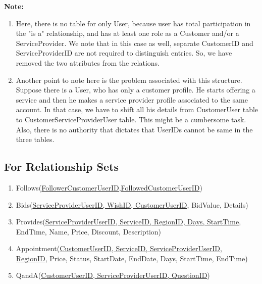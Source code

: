 \documentclass[a4paper]{article}
\begin{document}
\textbf{Note:} 
\begin{enumerate}

\item Here, there is no table for only User, because user has total participation in the "is a" relationship, and has at least one role as a Customer and/or a ServiceProvider. We note that in this case as well, separate CustomerID and ServiceProviderID are not required to distinguish entries. So, we have removed the two attributes from the relations.
\item Another point to note here is the problem associated with this structure. Suppose there is a User, who has only a customer profile. He starts offering a service and then he makes a service provider profile associated to the same account. In that case, we have to shift all his details from CustomerUser table to CustomerServiceProviderUser table. This might be a cumbersome task. Also, there is no authority that dictates that UserIDs cannot be same in the three tables.

\end{enumerate}


\subsection{For Relationship Sets}

\begin{enumerate}
\item Follows(\underline{FollowerCustomerUserID,FollowedCustomerUserID})
\item Bids(\underline{ServiceProviderUserID, WishID, CustomerUserID}, BidValue, Details)
\item Provides(\underline{ServiceProviderUserID, ServiceID, RegionID, Days, StartTime}, EndTime, Name, Price, Discount, Description)
\item Appointment(\underline{CustomerUserID, ServiceID, ServiceProviderUserID},\\ \underline{RegionID}, Price, Status, StartDate, EndDate, Days, StartTime, EndTime)  
\item QandA(\underline{CustomerUserID, ServiceProviderUserID, QuestionID})

\end{enumerate}
\end{document}
